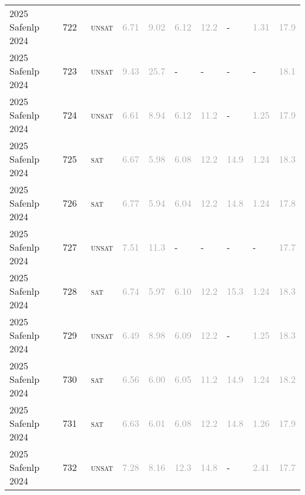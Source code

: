 \begin{center}
{\begin{longtable}{@{}llllllllll@{}}
2025 Safenlp 2024 & 722 & ~\textsc{unsat} & \textcolor{darkgray}{6.71} & \textcolor{darkgray}{9.02} & \textcolor{darkgray}{6.12} & \textcolor{darkgray}{12.2} & - & \textcolor{darkgray}{1.31} & \textcolor{darkgray}{17.9} \\
2025 Safenlp 2024 & 723 & ~\textsc{unsat} & \textcolor{darkgray}{9.43} & \textcolor{darkgray}{25.7} & - & - & - & - & \textcolor{darkgray}{18.1} \\
2025 Safenlp 2024 & 724 & ~\textsc{unsat} & \textcolor{darkgray}{6.61} & \textcolor{darkgray}{8.94} & \textcolor{darkgray}{6.12} & \textcolor{darkgray}{11.2} & - & \textcolor{darkgray}{1.25} & \textcolor{darkgray}{17.9} \\
2025 Safenlp 2024 & 725 & ~\textsc{sat} & \textcolor{darkgray}{6.67} & \textcolor{darkgray}{5.98} & \textcolor{darkgray}{6.08} & \textcolor{darkgray}{12.2} & \textcolor{darkgray}{14.9} & \textcolor{darkgray}{1.24} & \textcolor{darkgray}{18.3} \\
2025 Safenlp 2024 & 726 & ~\textsc{sat} & \textcolor{darkgray}{6.77} & \textcolor{darkgray}{5.94} & \textcolor{darkgray}{6.04} & \textcolor{darkgray}{12.2} & \textcolor{darkgray}{14.8} & \textcolor{darkgray}{1.24} & \textcolor{darkgray}{17.8} \\
2025 Safenlp 2024 & 727 & ~\textsc{unsat} & \textcolor{darkgray}{7.51} & \textcolor{darkgray}{11.3} & - & - & - & - & \textcolor{darkgray}{17.7} \\
2025 Safenlp 2024 & 728 & ~\textsc{sat} & \textcolor{darkgray}{6.74} & \textcolor{darkgray}{5.97} & \textcolor{darkgray}{6.10} & \textcolor{darkgray}{12.2} & \textcolor{darkgray}{15.3} & \textcolor{darkgray}{1.24} & \textcolor{darkgray}{18.3} \\
2025 Safenlp 2024 & 729 & ~\textsc{unsat} & \textcolor{darkgray}{6.49} & \textcolor{darkgray}{8.98} & \textcolor{darkgray}{6.09} & \textcolor{darkgray}{12.2} & - & \textcolor{darkgray}{1.25} & \textcolor{darkgray}{18.3} \\
2025 Safenlp 2024 & 730 & ~\textsc{sat} & \textcolor{darkgray}{6.56} & \textcolor{darkgray}{6.00} & \textcolor{darkgray}{6.05} & \textcolor{darkgray}{11.2} & \textcolor{darkgray}{14.9} & \textcolor{darkgray}{1.24} & \textcolor{darkgray}{18.2} \\
2025 Safenlp 2024 & 731 & ~\textsc{sat} & \textcolor{darkgray}{6.63} & \textcolor{darkgray}{6.01} & \textcolor{darkgray}{6.08} & \textcolor{darkgray}{12.2} & \textcolor{darkgray}{14.8} & \textcolor{darkgray}{1.26} & \textcolor{darkgray}{17.9} \\
2025 Safenlp 2024 & 732 & ~\textsc{unsat} & \textcolor{darkgray}{7.28} & \textcolor{darkgray}{8.16} & \textcolor{darkgray}{12.3} & \textcolor{darkgray}{14.8} & - & \textcolor{darkgray}{2.41} & \textcolor{darkgray}{17.7} \\

\end{longtable}}
\end{center}
